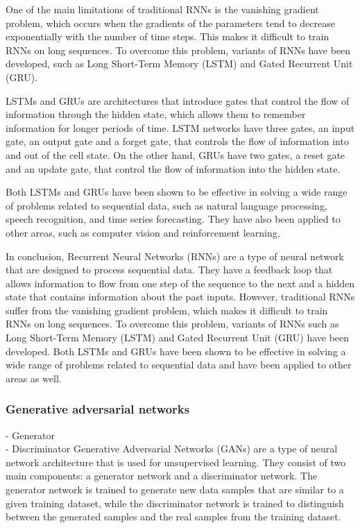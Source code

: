 One of the main limitations of traditional RNNs is the vanishing gradient problem, which occurs when the gradients of the parameters tend to decrease exponentially with the number of time steps. This makes it difficult to train RNNs on long sequences. To overcome this problem, variants of RNNs have been developed, such as Long Short-Term Memory (LSTM) and Gated Recurrent Unit (GRU).

LSTMs and GRUs are architectures that introduce gates that control the flow of information through the hidden state, which allows them to remember information for longer periods of time. LSTM networks have three gates, an input gate, an output gate and a forget gate, that controls the flow of information into and out of the cell state. On the other hand, GRUs have two gates, a reset gate and an update gate, that control the flow of information into the hidden state.

Both LSTMs and GRUs have been shown to be effective in solving a wide range of problems related to sequential data, such as natural language processing, speech recognition, and time series forecasting. They have also been applied to other areas, such as computer vision and reinforcement learning.

In conclusion, Recurrent Neural Networks (RNNs) are a type of neural network that are designed to process sequential data. They have a feedback loop that allows information to flow from one step of the sequence to the next and a hidden state that contains information about the past inputs. However, traditional RNNs suffer from the vanishing gradient problem, which makes it difficult to train RNNs on long sequences. To overcome this problem, variants of RNNs such as Long Short-Term Memory (LSTM) and Gated Recurrent Unit (GRU) have been developed. Both LSTMs and GRUs have been shown to be effective in solving a wide range of problems related to sequential data and have been applied to other areas as well.

\subsubsection{Generative adversarial networks}
- Generator\\
- Discriminator
Generative Adversarial Networks (GANs) are a type of neural network architecture that is used for unsupervised learning. They consist of two main components: a generator network and a discriminator network. The generator network is trained to generate new data samples that are similar to a given training dataset, while the discriminator network is trained to distinguish between the generated samples and the real samples from the training dataset.

